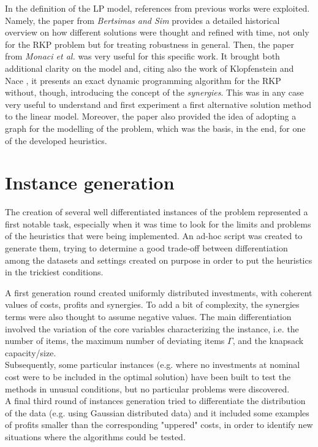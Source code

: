 \documentclass{article}
\begin{document}
In the definition of the LP model, references from previous works were exploited. Namely, the paper from \textit{Bertsimas and Sim} \cite{price} provides a detailed historical overview on how different solutions were thought and refined with time, not only for the RKP problem but for treating robustness in general. Then, the paper from \textit{Monaci et al.} \cite{Monaci} was very useful for this specific work. It brought both additional clarity on the model and, citing also the work of Klopfenstein and Nace \cite{Klopfenstein}, it presents an exact dynamic programming algorithm for the RKP without, though, introducing the concept of the \emph{synergies}. This was in any case very useful to understand and first experiment a first alternative solution method to the linear model. Moreover, the paper also provided the idea of adopting a graph for the modelling of the problem, which was the basis, in the end, for one of the developed heuristics. 

\section{Instance generation}
The creation of several well differentiated instances of the problem represented a first notable task, especially when it was time to look for the limits and problems of the heuristics that were being implemented. An ad-hoc script was created to generate them, trying to determine a good trade-off between differentiation among the datasets and settings created on purpose in order to put the heuristics in the trickiest conditions. 

A first generation round created uniformly distributed investments, with coherent values of costs, profits and synergies. To add a bit of complexity, the synergies terms were also thought to assume negative values. The main differentiation involved the variation of the core variables characterizing the instance, i.e. the number of items, the maximum number of deviating items $\Gamma$, and the knapsack capacity/size. \\
Subsequently, some particular instances (e.g. where no investments at nominal cost were to be included in the optimal solution) have been built to test the methods in unusual conditions, but no particular problems were discovered. \\
A final third round of instances generation tried to differentiate the distribution of the data (e.g. using Gaussian distributed data) and it included some examples of profits smaller than the corresponding "uppered" costs, in order to identify new situations where the algorithms could be tested.\\
\end{document}
